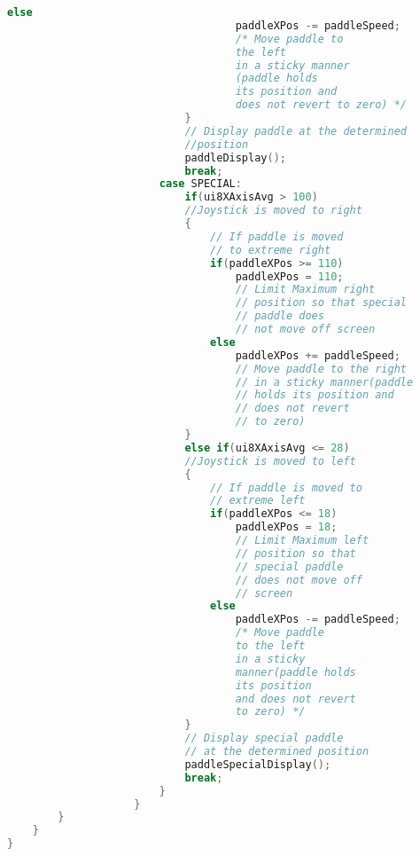 \documentclass{article}
\begin{document}
\begin{lstlisting}[basicstyle = \small, language = C]
                                else
                                    paddleXPos -= paddleSpeed; 
                                    /* Move paddle to 
                                    the left
                                    in a sticky manner
                                    (paddle holds 
                                    its position and 
                                    does not revert to zero) */
                            }
                            // Display paddle at the determined 
                            //position
                            paddleDisplay();
                            break;
                        case SPECIAL:
                            if(ui8XAxisAvg > 100) 
                            //Joystick is moved to right
                            {
                                // If paddle is moved 
                                // to extreme right
                                if(paddleXPos >= 110)
                                    paddleXPos = 110; 
                                    // Limit Maximum right
                                    // position so that special
                                    // paddle does 
                                    // not move off screen
                                else
                                    paddleXPos += paddleSpeed; 
                                    // Move paddle to the right 
                                    // in a sticky manner(paddle 
                                    // holds its position and 
                                    // does not revert
                                    // to zero)
                            }
                            else if(ui8XAxisAvg <= 28) 
                            //Joystick is moved to left
                            {
                                // If paddle is moved to 
                                // extreme left
                                if(paddleXPos <= 18)
                                    paddleXPos = 18; 
                                    // Limit Maximum left 
                                    // position so that 
                                    // special paddle 
                                    // does not move off 
                                    // screen
                                else
                                    paddleXPos -= paddleSpeed; 
                                    /* Move paddle 
                                    to the left 
                                    in a sticky 
                                    manner(paddle holds 
                                    its position 
                                    and does not revert 
                                    to zero) */
                            }
                            // Display special paddle 
                            // at the determined position
                            paddleSpecialDisplay();
                            break;
                        }
                    }
        }
    }
}
  \end{lstlisting}
\end{document}
